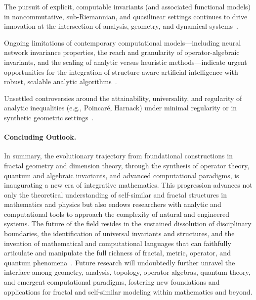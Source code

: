 \documentclass[sigconf]{acmart}
\begin{document}
The pursuit of explicit, computable invariants (and associated functional models) in noncommutative, sub-Riemannian, and quasilinear settings continues to drive innovation at the intersection of analysis, geometry, and dynamical systems~\cite{ref26,ref61,ref95}.

Ongoing limitations of contemporary computational models---including neural network invariance properties, the reach and granularity of operator-algebraic invariants, and the scaling of analytic versus heuristic methods---indicate urgent opportunities for the integration of structure-aware artificial intelligence with robust, scalable analytic algorithms~\cite{ref44,ref60,ref26}.

Unsettled controversies around the attainability, universality, and regularity of analytic inequalities (e.g., Poincaré, Harnack) under minimal regularity or in synthetic geometric settings~\cite{ref40,ref93}.

\paragraph{Concluding Outlook.}

In summary, the evolutionary trajectory from foundational constructions in fractal geometry and dimension theory, through the synthesis of operator theory, quantum and algebraic invariants, and advanced computational paradigms, is inaugurating a new era of integrative mathematics. This progression advances not only the theoretical understanding of self-similar and fractal structures in mathematics and physics but also endows researchers with analytic and computational tools to approach the complexity of natural and engineered systems. The future of the field resides in the sustained dissolution of disciplinary boundaries, the identification of universal invariants and structures, and the invention of mathematical and computational languages that can faithfully articulate and manipulate the full richness of fractal, metric, operator, and quantum phenomena~\cite{ref1,ref2,ref3,ref4,ref5,ref6,ref7,ref8,ref9,ref10,ref11,ref12,ref13,ref14,ref15,ref16,ref17,ref18,ref19,ref20,ref21,ref22,ref23,ref24,ref25,ref26,ref27,ref28,ref29,ref30,ref31,ref32,ref33,ref34,ref35,ref36,ref37,ref38,ref39,ref40,ref41,ref42,ref43,ref44,ref45,ref46,ref47,ref48,ref49,ref50,ref51,ref52,ref53,ref54,ref55,ref56,ref57,ref58,ref59,ref60,ref61,ref62,ref63,ref64,ref65,ref66,ref67,ref68,ref69,ref70,ref71,ref72,ref73,ref74,ref75,ref76,ref77,ref78,ref79,ref80,ref81,ref82,ref83,ref84,ref85,ref86,ref87,ref88,ref89,ref90,ref91,ref92,ref93,ref94,ref95,ref96,ref97,ref98,ref99,ref100,ref101,ref102,ref103,ref104,ref105,ref106,ref107,ref108,ref109}. Future research will undoubtedly further unravel the interface among geometry, analysis, topology, operator algebras, quantum theory, and emergent computational paradigms, fostering new foundations and applications for fractal and self-similar modeling within mathematics and beyond.






\end{document}
